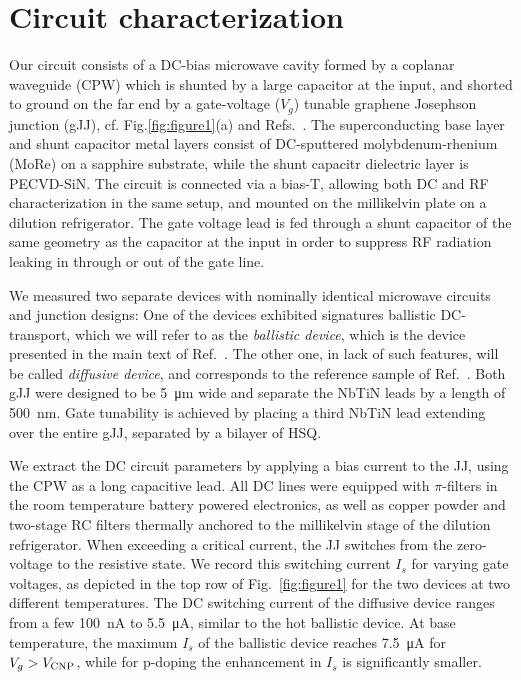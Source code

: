\section{Circuit characterization}

Our circuit consists of a DC-bias microwave cavity formed by a coplanar waveguide (CPW) which is shunted by a large capacitor at the input, and shorted to ground on the far end by a gate-voltage ($V_g$) tunable graphene Josephson junction (gJJ), cf. Fig.\ref{fig:figure1}(a) and Refs.~\cite{schmidtBallisticGrapheneSuperconducting2018,schmidtCurrentDetectionUsing2020,bosmanBroadbandArchitectureGalvanically2015c}.
%
The superconducting base layer and shunt capacitor metal layers consist of DC-sputtered molybdenum-rhenium (MoRe) on a sapphire substrate, while the shunt capacitr dielectric layer is PECVD-SiN.
%
The circuit is connected via a bias-T, allowing both DC and RF characterization in the same setup, and mounted on the millikelvin plate on a dilution refrigerator.
%
The gate voltage lead is fed through a shunt capacitor of the same geometry as the capacitor at the input in order to suppress RF radiation leaking in through or out of the gate line.

We measured two separate devices with nominally identical microwave circuits and junction designs:
%
One of the devices exhibited signatures ballistic DC-transport, which we will refer to as the \textit{ballistic device}, which is the device presented in the main text of Ref.~\cite{schmidtBallisticGrapheneSuperconducting2018}.
%
The other one, in lack of such features, will be called \textit{diffusive device}, and corresponds to the reference sample of Ref.~\cite{schmidtBallisticGrapheneSuperconducting2018}.
%
Both gJJ were designed to be \SI{5}{\micro\meter} wide and separate the NbTiN leads by a length of \SI{500}{\nano\meter}.
%
Gate tunability is achieved by placing a third NbTiN lead extending over the entire gJJ, separated by a bilayer of HSQ.

We extract the DC circuit parameters by applying a bias current to the JJ, using the CPW as a long capacitive lead.
%
All DC lines were equipped with $\pi$-filters in the room temperature battery powered electronics, as well as copper powder and two-stage RC filters thermally anchored to the millikelvin stage of the dilution refrigerator.
%
When exceeding a critical current, the JJ switches from the zero-voltage to the resistive state.
%
We record this switching current $I_s$ for varying gate voltages, as depicted in the top row of Fig.~\ref{fig:figure1} for the two devices at two different temperatures.
%
The DC switching current of the diffusive device ranges from a few \SI{100}{\nano\ampere} to \SI{5.5}{\micro\ampere}, similar to the hot ballistic device.
%
At base temperature, the maximum $I_s$ of the ballistic device reaches \SI{7.5}{\micro\ampere} for $V_g>V_{\rm CNP}$, while for p-doping the enhancement in $I_s$ is significantly smaller.

